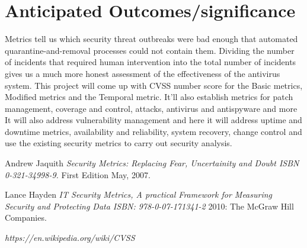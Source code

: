 \documentclass{article}
\begin{document}
\section{Anticipated Outcomes/significance} Metrics tell us
which security threat outbreaks were bad enough that automated quarantine-and-removal
processes could not contain them. Dividing the number of incidents that required
human intervention into the total number of incidents gives us a much more honest
assessment of the effectiveness of the antivirus system. \linebreak
This project will come up with CVSS number score for the Basic metrics, Modified metrics and the Temporal metric. It’ll also establish metrics for patch management, coverage and control, attacks, antivirus and antispyware and more
It will also address vulnerability management and here it will address uptime and downtime metrics, availability and reliability, system recovery, change control and use the existing security metrics to carry out security analysis.

 \begin{thebibliography}{1}

   Andrew Jaquith {\em Security Metrics: Replacing Fear, Uncertainity and Doubt
 ISBN 0-321-34998-9.} First Edition May, 2007.

    Lance Hayden {\em IT Security Metrics, A practical Framework for Measuring Security and Protecting Data ISBN: 978-0-07-171341-2} 2010:
  The McGraw Hill Companies.

    {\em https://en.wikipedia.org/wiki/CVSS

} 

  \end{thebibliography}
\end{document}
